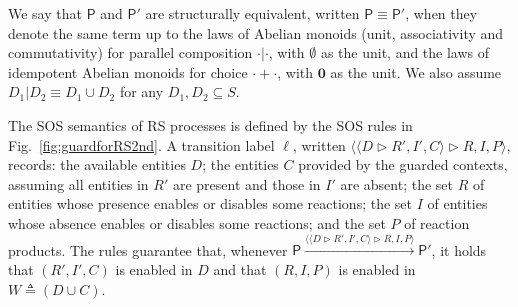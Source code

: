 \documentclass[sn-mathphys-num,a4paper,iicol,lineno,pdflatex]{sn-jnl-hacked}
\newcommand{\nil}{\mathbf{0}}
\newcommand{\obs}[2]{\langle #1\vartriangleright #2\rangle}
\theoremstyle{thmstyleone}%
\theoremstyle{thmstyletwo}%
\theoremstyle{thmstylethree}%
\begin{document}
We say that $\mathsf{P}$ and $\mathsf{P}'$ are structurally equivalent, written $\mathsf{P} \equiv \mathsf{P}'$, when they denote the same term up to the laws of Abelian monoids (unit, associativity and commutativity) for  parallel composition $\cdot | \cdot$, with $\emptyset$ as the unit, and the laws of idempotent Abelian monoids for choice $\cdot +\cdot$, with $\nil$ as the unit. We also assume $D_1 | D_2 \equiv D_1\cup D_2$ for any $D_1,D_2\subseteq S$.

The SOS semantics of  RS processes is defined by the SOS rules in Fig.~\ref{fig:guardforRS2nd}.
A transition label $\ell$, written $\obs{\obs{D}{R',I',C}}{R,I,P}$, records:
the available entities $D$; the entities $C$ provided by the guarded contexts, assuming all entities in $R'$ are present and those in $I'$ are absent;
the set $R$ of entities whose presence enables or disables some reactions;
the set $I$ of entities whose absence  enables or disables some reactions;
and the set $P$ of reaction products.
The  rules guarantee that, whenever $\mathsf{P}\xrightarrow{\obs{\obs{D}{R',I',C}}{R,I,P}} \mathsf{P}'$, it holds that $(R',I',C)$ is enabled in $D$ and that
$(R,I,P)$ is enabled in $W\triangleq (D\cup C)$.
\end{document}
